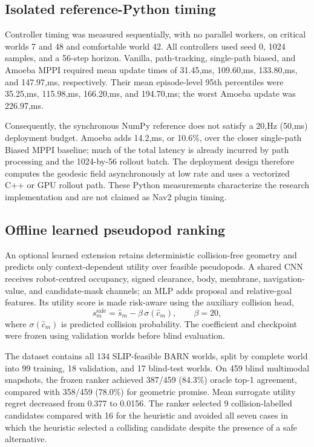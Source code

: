 \documentclass[11pt,a4paper]{article}
\begin{document}
\subsection{Isolated reference-Python timing}

Controller timing was measured sequentially, with no parallel workers, on
critical worlds 7 and 48 and comfortable world 42. All controllers used seed
0, 1024 samples, and a 56-step horizon. Vanilla, path-tracking, single-path
biased, and Amoeba MPPI required mean update times of 31.45,ms, 109.60,ms,
133.80,ms, and 147.97,ms, respectively. Their mean episode-level 95th
percentiles were 35.25,ms, 115.98,ms, 166.20,ms, and 194.70,ms; the worst
Amoeba update was 226.97,ms.

Consequently, the synchronous NumPy reference does not satisfy a 20,Hz
(50,ms) deployment budget. Amoeba adds 14.2,ms, or 10.6\%, over the closer
single-path Biased MPPI baseline; much of the total latency is already incurred
by path processing and the 1024-by-56 rollout batch. The deployment design
therefore computes the geodesic field asynchronously at low rate and uses a
vectorized C++ or GPU rollout path. These Python measurements characterize the
research implementation and are not claimed as Nav2 plugin timing.

\subsection{Offline learned pseudopod ranking}

An optional learned extension retains deterministic collision-free geometry
and predicts only context-dependent utility over feasible pseudopods. A shared
CNN receives robot-centred occupancy, signed clearance, body, membrane,
navigation-value, and candidate-mask channels; an MLP adds proposal and
relative-goal features. Its utility score is made risk-aware using the
auxiliary collision head,
\begin{equation}
  s_m^{\mathrm{safe}}
  =\hat{s}_m-\beta\,\sigma(\hat{c}_m),
  \qquad \beta=20,
\end{equation}
where $\sigma(\hat{c}_m)$ is predicted collision probability. The coefficient
and checkpoint were frozen using validation worlds before blind evaluation.

The dataset contains all 134 SLIP-feasible BARN worlds, split by complete
world into 99 training, 18 validation, and 17 blind-test worlds. On 459 blind
multimodal snapshots, the frozen ranker achieved 387/459 (84.3\%) oracle
top-1 agreement, compared with 358/459 (78.0\%) for geometric promise. Mean
surrogate utility regret decreased from 0.377 to 0.0156. The ranker selected
9 collision-labelled candidates compared with 16 for the heuristic and
avoided all seven cases in which the heuristic selected a colliding candidate
despite the presence of a safe alternative.
\end{document}
